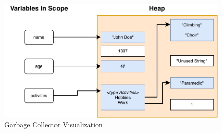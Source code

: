 \begin{figure}[htp!]
    \centering
    \includegraphics[width=\textwidth]{assets/figures/chapter3/gc.pdf}
    \caption{Garbage Collector Visualization}
    \label{fig:gc-visualization}
\end{figure}
